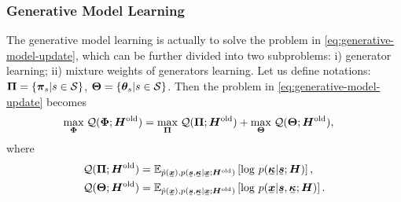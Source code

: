 \documentclass{ecai}
\newcommand{\ubar}[1]{\mkern2mu\underline{\mkern-2mu #1\mkern-2mu}\mkern2mu}
\newcommand{\ubm}[1]{\ubar{\bm{#1}}}
\begin{document}
\subsubsection{Generative Model Learning}
The generative model learning is actually to solve the problem in \eqref{eq:generative-model-update}, which can be further divided into two subproblems: i) generator learning; ii) mixture weights of generators learning. Let us define notations:
$\bm{\Pi} = \left\{  \bm{\pi}_{s}| s\in \mathcal{S} \right\}$, $\bm{\Theta}=\left\{ \bm{\theta}_s| s\in \mathcal{S} \right\}$. 
Then the problem in \eqref{eq:generative-model-update} becomes
\begin{align}\label{eq:sub-gm}
  &\underset{\bm{\Phi}}{\max}\; \mathcal{Q}(\bm{\Phi}; \bm{H}^{\mathrm{old}}) = \underset{\bm{\Pi}}{\max}\; \mathcal{Q}(\bm{\Pi}; \bm{H}^{\mathrm{old}}) + \underset{\bm{\Theta}}{\max}\; \mathcal{Q}(\bm{\Theta}; \bm{H}^{\mathrm{old}}),
\end{align}
where
\begin{align}
  \Qq(\bm{\Pi}; \bm{H}^{\mathrm{old}})  &=\EE_{\hat{p}(\ubm{x}),p(\ubm{s},\ubm{\kappa}| \ubm{x}; \bm{H}^{\mathrm{old}})}\left[  \log\,p(\ubm{\kappa}| \ubm{s}; \bm{H})\right], \\
  \Qq(\bm{\Theta}; \bm{H}^{\mathrm{old}}) &=\EE_{\hat{p}(\ubm{x}),p(\ubm{s},\ubm{\kappa}| \ubm{x}; \bm{H}^{\mathrm{old}})}\left[  \log\,p(\ubm{x}| \ubm{s},\ubm{\kappa}; \bm{H})\right].
\end{align}
\end{document}

